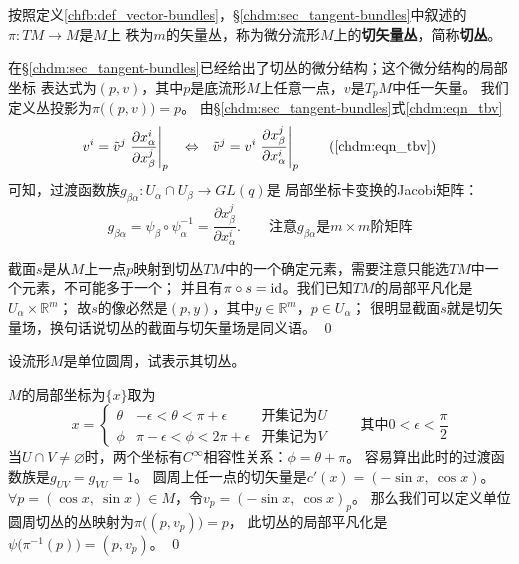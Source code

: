 \begin{example}\label{chfb:exm_tb}
    按照定义\ref{chfb:def_vector-bundles}，\S \ref{chdm:sec_tangent-bundles}中叙述的$\pi:TM\to M$是$M$上
    秩为$m$的矢量丛，称为微分流形$M$上的\textbf{切矢量丛}，简称\textbf{切丛}。
\end{example}
在\S \ref{chdm:sec_tangent-bundles}已经给出了切丛的微分结构；这个微分结构的局部坐标
表达式为$(p,v)$，其中$p$是底流形$M$上任意一点，$v$是$T_pM$中任一矢量。
我们定义丛投影为$\pi\bigl( (p,v)\bigr)=p$。
由\S \ref{chdm:sec_tangent-bundles}式\eqref{chdm:eqn_tbv}
\begin{equation}
    v^i = \tilde{v}^j \left. \frac{\partial {x}^i_\alpha}{\partial {x}^j_\beta}  \right | _p
    {\quad \Leftrightarrow \quad}
    \tilde{v}^j = {v}^i \left. \frac{\partial {x}^j_\beta}{\partial {x}^i_\alpha}  \right | _p 
    \tag{\ref{chdm:eqn_tbv}}
\end{equation}
可知，过渡函数族$g_{\beta\alpha}: U_\alpha \cap U_\beta \to GL(q)$是
局部坐标卡变换的Jacobi矩阵：
\begin{equation}
    g_{\beta\alpha} = \psi_\beta \circ \psi^{-1}_{\alpha}
    = \frac{\partial {x}^j_\beta}{\partial {x}^i_\alpha}  .
    \qquad \text{注意}g_{\beta\alpha}\text{是} m\times m \text{阶矩阵}
\end{equation}

截面$s$是从$M$上一点$p$映射到切丛$TM$中的一个确定元素，需要注意只能选$TM$中一个元素，不可能多于一个；
并且有$\pi \circ s = {\rm id}$。我们已知$TM$的局部平凡化是$U_\alpha \times \mathbb{R}^m$；
故$s$的像必然是$(p,y)$，其中$y\in \mathbb{R}^m$，$p\in U_\alpha$；
很明显截面$s$就是{\kaishu 切矢量场}，换句话说切丛的截面与切矢量场是同义语。
\qed

\begin{example}
    设流形$M$是单位圆周，试表示其切丛。
\end{example}
$M$的局部坐标为$\{x\}$取为
\begin{equation*}
    x=\left\{\begin{array}{ccc}
        \theta& -\epsilon <\theta<\pi+\epsilon & \text{开集记为}U \\
        \phi & \pi -\epsilon <\phi <2\pi +\epsilon  & \text{开集记为}V
    \end{array} \right.
    \qquad \text{其中} 0<\epsilon<\frac{\pi}{2}
\end{equation*}
当$U\cap V\neq \varnothing$时，两个坐标有$C^\infty$相容性关系：$\phi=\theta + \pi$。
容易算出此时的过渡函数族是$g_{UV}=g_{VU}=1$。
圆周上任一点的切矢量是$c'(x)=(-\sin x,\ \cos x)$。
$\forall p=(\cos x,\ \sin x)\in M$，令$v_p=(-\sin x,\ \cos x)_p$。
那么我们可以定义单位圆周切丛的丛映射为$\pi \bigl( (p,v_p) \bigr)=p$，
此切丛的局部平凡化是$\psi\bigl(\pi^{-1}(p) \bigr)=(p,v_p)$。
\qed


